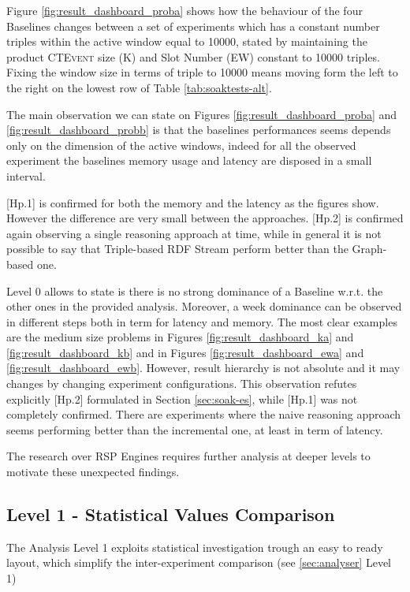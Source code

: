Figure \ref{fig:result_dashboard_proba}  shows how the behaviour of the four Baselines changes between a set of experiments which has a constant number triples within the active window equal to 10000, stated by maintaining the product \textsc{CTEvent} size (K) and Slot Number (EW) constant to 10000 triples. Fixing the window size in terms of triple to 10000 means moving form the left to the right on the lowest row of Table \ref{tab:soaktests-alt}. 

The main observation we can state on Figures \ref{fig:result_dashboard_proba} and \ref{fig:result_dashboard_probb}  is that the baselines performances seems depends only on the dimension of the active windows, indeed for all the observed experiment the baselines memory usage and latency are disposed in a small interval.

[Hp.1] is confirmed for both the memory and the latency as the figures show. However the difference are very small between the approaches. [Hp.2] is confirmed again observing a single reasoning approach at time, while in general it is not possible to say that Triple-based RDF Stream perform better than the Graph-based one.

Level 0 allows to state is there is no strong dominance of a Baseline w.r.t. the other ones in the provided analysis. Moreover, a week dominance can be observed in different steps both in term for latency  and memory. The most clear examples are the medium size problems in Figures \ref{fig:result_dashboard_ka} and \ref{fig:result_dashboard_kb} and in Figures \ref{fig:result_dashboard_ewa} and \ref{fig:result_dashboard_ewb}. However, result hierarchy is not absolute and it may changes by changing experiment configurations. This observation refutes explicitly [Hp.2] formulated in Section \ref{sec:soak-es}, while [Hp.1] was not completely confirmed. There are experiments where the naive  reasoning  approach seems performing better than the incremental one, at least in term of latency. 

The research over RSP Engines requires further analysis at deeper levels to motivate these unexpected findings.

\subsection{Level 1 - Statistical Values Comparison}\label{sec:eval-level1}

The Analysis Level 1 exploits statistical investigation trough an easy to ready layout, which simplify the inter-experiment comparison (see \ref{sec:analyser} Level 1)

